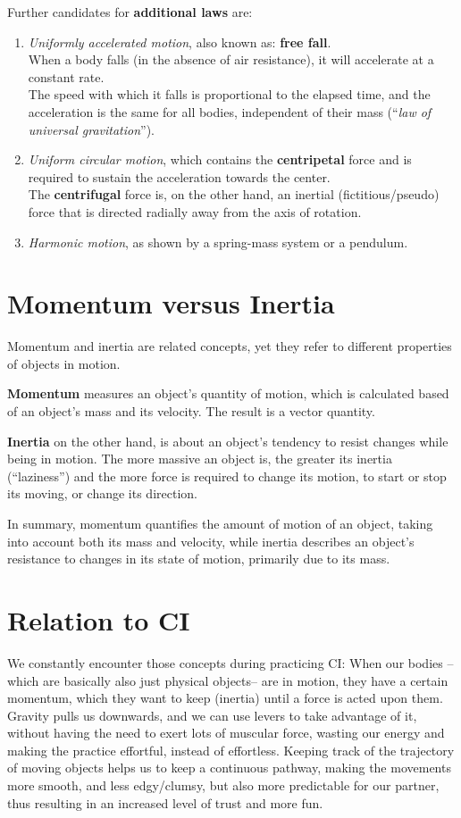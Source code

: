Further candidates for \textbf{additional laws} are:
\begin{enumerate}
    \item \textit{Uniformly accelerated motion}, also known as: \textbf{free fall}. \\
    When a body falls (in the absence of air resistance), it will accelerate at a constant rate. \\
    The speed with which it falls is proportional to the elapsed time, and the acceleration is the same for all bodies, independent of their mass (``\textit{law of universal gravitation}'').
    \item \textit{Uniform circular motion}, which contains the \textbf{centripetal} force and is required to sustain the acceleration towards the center. \\
    The \textbf{centrifugal} force is, on the other hand, an inertial (fictitious/pseudo) force that is directed radially away from the axis of rotation.
    \item \textit{Harmonic motion}, as shown by a spring-mass system or a pendulum.
\end{enumerate}

\section{Momentum versus Inertia}\label{sec:momentum-versus-inertia}

Momentum and inertia are related concepts, yet they refer to different properties of objects in motion.

\textbf{Momentum} measures an object's quantity of motion, which is calculated based of an object's mass and its velocity.
The result is a vector quantity.

\textbf{Inertia} on the other hand, is about an object's tendency to resist changes while being in motion.
The more massive an object is, the greater its inertia (``laziness'') and the more force is required to change its motion, to start or stop its moving, or change its direction.

In summary, momentum quantifies the amount of motion of an object, taking into account both its mass and velocity, while inertia describes an object's resistance to changes in its state of motion, primarily due to its mass.

\section{Relation to CI}\label{sec:relation-to-ci}

We constantly encounter those concepts during practicing CI: When our bodies --which are basically also just physical objects-- are in motion, they have a certain momentum, which they want to keep (inertia) until a force is acted upon them.
Gravity pulls us downwards, and we can use levers to take advantage of it, without having the need to exert lots of muscular force, wasting our energy and making the practice effortful, instead of effortless.
Keeping track of the trajectory of moving objects helps us to keep a continuous pathway, making the movements more smooth, and less edgy/clumsy, but also more predictable for our partner, thus resulting in an increased level of trust and more fun.
